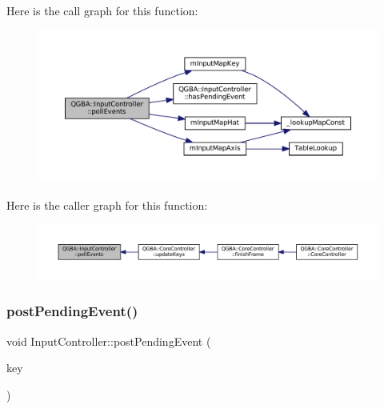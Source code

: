 Here is the call graph for this function\+:
\nopagebreak
\begin{figure}[H]
\begin{center}
\leavevmode
\includegraphics[width=350pt]{class_q_g_b_a_1_1_input_controller_a6bef594195d44a24fff69b4fd8aaeef1_cgraph}
\end{center}
\end{figure}
Here is the caller graph for this function\+:
\nopagebreak
\begin{figure}[H]
\begin{center}
\leavevmode
\includegraphics[width=350pt]{class_q_g_b_a_1_1_input_controller_a6bef594195d44a24fff69b4fd8aaeef1_icgraph}
\end{center}
\end{figure}
\mbox{\label{class_q_g_b_a_1_1_input_controller_a6a77a32d50689865c44ac9d0f677cda8}} 
\subsubsection{\texorpdfstring{post\+Pending\+Event()}{postPendingEvent()}}
{\footnotesize\ttfamily void Input\+Controller\+::post\+Pending\+Event (\begin{DoxyParamCaption}\item[{G\+B\+A\+Key}]{key }\end{DoxyParamCaption})\hspace{0.3cm}{\ttfamily [private]}}

